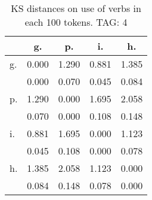 \begin{table}[h!]
\begin{center}
\begin{tabular}{| l | c | c | c | c |}\hline
 & g. & p. & i. & h. \\\hline
g. & 0.000  & 1.290  & 0.881  & 1.385 \\\hline
 & 0.000  & 0.070  & 0.045  & 0.084 \\\hline
p. & 1.290  & 0.000  & 1.695  & 2.058 \\\hline
 & 0.070  & 0.000  & 0.108  & 0.148 \\\hline
i. & 0.881  & 1.695  & 0.000  & 1.123 \\\hline
 & 0.045  & 0.108  & 0.000  & 0.078 \\\hline
h. & 1.385  & 2.058  & 1.123  & 0.000 \\\hline
 & 0.084  & 0.148  & 0.078  & 0.000 \\\hline
\end{tabular}
\caption{KS distances on use of verbs in each 100 tokens. TAG: 4}
\end{center}
\end{table}